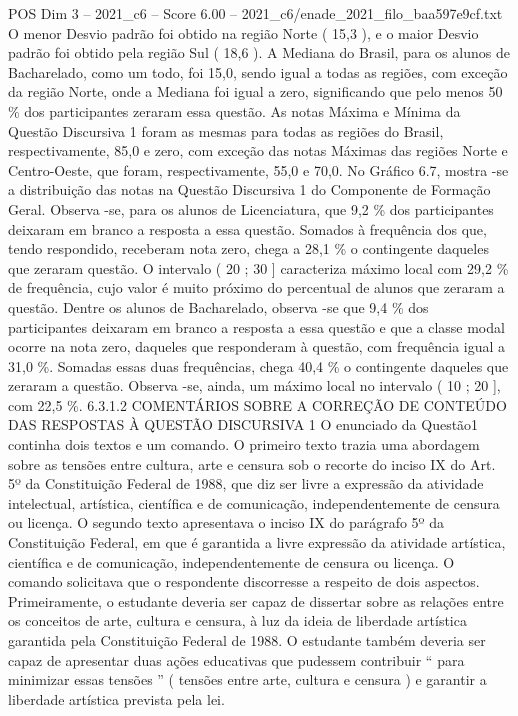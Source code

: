 \begin{textsample}{POS Dim 3 – 2021\_c6 – Score 6.00 – 2021\_c6/enade\_2021\_filo\_baa597e9cf.txt}
O menor Desvio padrão foi obtido na região Norte ( 15,3 ), e o maior Desvio padrão foi obtido pela região Sul ( 18,6 ).
A Mediana do Brasil, para os alunos de Bacharelado, como um todo, foi 15,0, sendo igual a todas as regiões, com exceção da região Norte, onde a Mediana foi igual a zero, significando que pelo menos 50 \% dos participantes zeraram essa questão.
As notas Máxima e Mínima da Questão Discursiva 1 foram as mesmas para todas as regiões do Brasil, respectivamente, 85,0 e zero, com exceção das notas Máximas das regiões Norte e Centro-Oeste, que foram, respectivamente, 55,0 e 70,0.
No Gráfico 6.7, mostra -se a distribuição das notas na Questão Discursiva 1 do Componente de Formação Geral.
Observa -se, para os alunos de Licenciatura, que 9,2 \% dos participantes deixaram em branco a resposta a essa questão.
Somados à frequência dos que, tendo respondido, receberam nota zero, chega a 28,1 \% o contingente daqueles que zeraram questão.
O intervalo ( 20 ; 30 ] caracteriza máximo local com 29,2 \% de frequência, cujo valor é muito próximo do percentual de alunos que zeraram a questão.
Dentre os alunos de Bacharelado, observa -se que 9,4 \% dos participantes deixaram em branco a resposta a essa questão e que a classe modal ocorre na nota zero, daqueles que responderam à questão, com frequência igual a 31,0 \%.
Somadas essas duas frequências, chega 40,4 \% o contingente daqueles que zeraram a questão.
Observa -se, ainda, um máximo local no intervalo ( 10 ; 20 ], com 22,5 \%. 6.3.1.2 COMENTÁRIOS SOBRE A CORREÇÃO DE CONTEÚDO DAS RESPOSTAS À QUESTÃO DISCURSIVA 1 O enunciado da Questão1 continha dois textos e um comando.
O primeiro texto trazia uma abordagem sobre as tensões entre cultura, arte e censura sob o recorte do inciso IX do Art. 5º da Constituição Federal de 1988, que diz ser livre a expressão da atividade intelectual, artística, científica e de comunicação, independentemente de censura ou licença.
O segundo texto apresentava o inciso IX do parágrafo 5º da Constituição Federal, em que é garantida a livre expressão da atividade artística, científica e de comunicação, independentemente de censura ou licença.
O comando solicitava que o respondente discorresse a respeito de dois aspectos.
Primeiramente, o estudante deveria ser capaz de dissertar sobre as relações entre os conceitos de arte, cultura e censura, à luz da ideia de liberdade artística garantida pela Constituição Federal de 1988.
O estudante também deveria ser capaz de apresentar duas ações educativas que pudessem contribuir “ para minimizar essas tensões ” ( tensões entre arte, cultura e censura ) e garantir a liberdade artística prevista pela lei.

\end{textsample}
